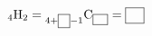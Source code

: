 ${}_4\mathrm{H}_2={}_{4+\text{\blank[1.2em]}-1}\mathrm{C}_{\text{\scriptsize\setlength{\fboxsep}{1.5pt}\framebox[1.5em]{\rule{0pt}{1.6ex}}}}=\blank$
